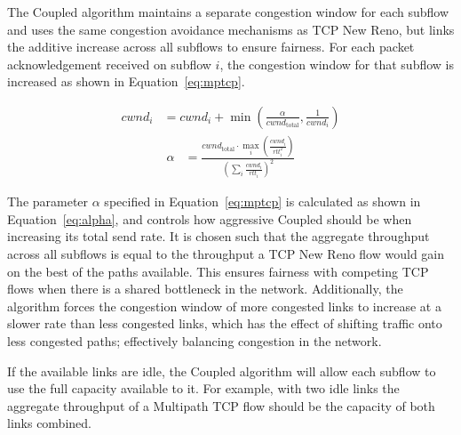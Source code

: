 The Coupled algorithm maintains a separate congestion window for each subflow
and uses the same congestion avoidance mechanisms as TCP New Reno, but links the
additive increase across all subflows to ensure fairness. For each packet
acknowledgement received on subflow $i$, the congestion window for that subflow is increased as
shown in Equation~\ref{eq:mptcp}.

\begin{align}
  cwnd_i &= cwnd_i +
    \min\left(\frac{\alpha}{cwnd_\text{total}}, \frac{1}{cwnd_i}\right)\label{eq:mptcp}
\end{align}
\begin{align}
  \alpha &=
    \frac{cwnd_\text{total} \cdot \max_i\left(\frac{cwnd_i}{rtt_i^2}\right)}
         {(\sum_i \frac{cwnd_i}{rtt_i})^2}\label{eq:alpha}
\end{align}

The parameter $\alpha$ specified in Equation~\ref{eq:mptcp} is calculated as
shown in Equation~\ref{eq:alpha}, and controls how
aggressive Coupled should be when increasing its total send rate. It is chosen
such that the aggregate throughput across all subflows is equal to the
throughput a TCP New Reno flow would gain on the best of the paths available.
This ensures fairness with competing TCP flows when there is a shared
bottleneck in the network.  Additionally, the algorithm forces the congestion
window of more congested links to increase at a slower rate than less congested
links, which has the effect of shifting traffic onto less congested paths;
effectively balancing congestion in the network.

If the available links are idle, the Coupled algorithm will allow each subflow to
use the full capacity available to it. For example, with two idle links the aggregate
throughput of a Multipath TCP flow should be the capacity of both links combined.

